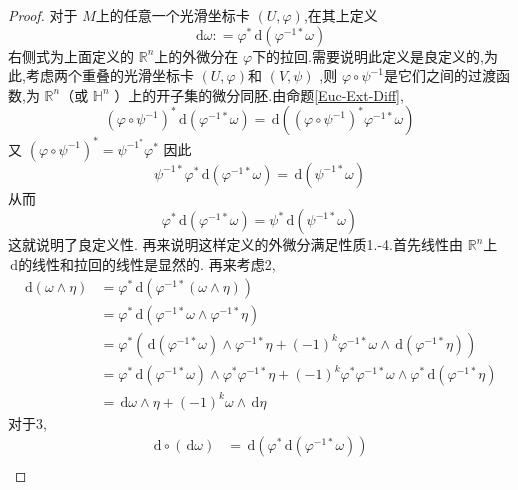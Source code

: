 \documentclass[../../几何与拓扑.tex]{subfiles}
\begin{document}
\begin{proof}
    对于 $ M $上的任意一个光滑坐标卡 $ \left( U,\varphi  \right)  $,在其上定义 $$
     \,\mathrm{d}  \omega : = \varphi ^{*} \,\mathrm{d} \left( \varphi ^{-1*} \omega  \right) 
    $$ 右侧式为上面定义的  $ \mathbb{R} ^{n} $上的外微分在 $ \varphi  $下的拉回.需要说明此定义是良定义的,为此,考虑两个重叠的光滑坐标卡 $ \left( U,\varphi  \right)  $和 $ \left( V,\psi  \right)  $
    ,则 $ \varphi \circ \psi ^{-1}  $是它们之间的过渡函数,为 $ \mathbb{R} ^{n} $（或 $ \mathbb{H}^{n} $ ）上的开子集的微分同胚.由命题\ref{Euc-Ext-Diff}, $$
    \left( \varphi \circ \psi ^{-1}  \right)^{*}  \,\mathrm{d} \left( \varphi ^{-1*}  \omega   \right)  = \,\mathrm{d} \left(  \left( \varphi \circ \psi ^{-1}  \right)^{*} \varphi ^{-1*} \omega    \right) 
    $$   又 $ \left( \varphi \circ \psi ^{-1}  \right)^{*} = \psi ^{-1^{*}} \varphi ^{*}   $ 因此 $$
    \psi ^{-1*} \varphi ^{*} \,\mathrm{d} \left( \varphi ^{-1*} \omega   \right)= \,\mathrm{d} \left( \psi ^{-1*} \omega   \right)   
    $$从而 $$
    \varphi ^{*}\,\mathrm{d} \left( \varphi ^{-1*} \omega   \right)= \psi^{*} \,\mathrm{d} \left( \psi ^{-1*} \omega   \right)  
    $$这就说明了良定义性.
    再来说明这样定义的外微分满足性质1.-4.首先线性由 $ \mathbb{R} ^{n} $上 $ \,\mathrm{d}  $的线性和拉回的线性是显然的. 再来考虑2, $$
    \begin{aligned}
        \,\mathrm{d} \left(  \omega \wedge \eta  \right) & = \varphi ^{*} \,\mathrm{d} \left( \varphi ^{-1*} \left( \omega \wedge \eta  \right)  \right)  \\ 
         & = \varphi ^{*}\,\mathrm{d} \left( \varphi ^{-1*} \omega \wedge \varphi ^{-1*}\eta  \right) \\ 
          & = \varphi ^{*}\left( \,\mathrm{d} \left( \varphi ^{-1*} \omega  \right) \wedge \varphi ^{-1*}\eta  + \left( -1 \right)^{k} \varphi ^{-1*} \omega \wedge  \,\mathrm{d} \left( \varphi ^{-1*}\eta  \right)  \right)\\ 
           & = \varphi ^{*}\,\mathrm{d} \left( \varphi ^{-1*} \omega  \right) \wedge  \varphi ^{*} \varphi ^{-1*}\eta  +  \left( -1 \right)^{k}\varphi ^{*} \varphi ^{-1*} \omega \wedge \varphi ^{*}\,\mathrm{d} \left( \varphi ^{-1*}\eta  \right)  \\ 
            & =  \,\mathrm{d}  \omega \wedge \eta + \left( -1 \right)^{k}  \omega \wedge \,\mathrm{d} \eta   
    \end{aligned} 
    $$  对于3, $$
    \begin{aligned}
    \,\mathrm{d} \circ \left( \,\mathrm{d}  \omega  \right) &= \,\mathrm{d} \left( \varphi ^{*}\,\mathrm{d} \left( \varphi ^{-1*} \omega  \right)  \right)\\ 

\end{aligned}$$
\end{proof}
\end{document}
